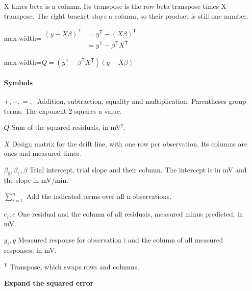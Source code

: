 \documentclass[11pt,a4paper]{article}
\begin{document}
X times beta is a column. Its transpose is the row beta transpose times X transpose. The right bracket stays a column, so their product is still one number.
\begin{center}\begin{adjustbox}{max width=\linewidth}$\displaystyle \begin{aligned}(y-X\beta)^{\mathsf T}&=y^{\mathsf T}-(X\beta)^{\mathsf T}\\&=y^{\mathsf T}-\beta^{\mathsf T}X^{\mathsf T}\end{aligned}$\end{adjustbox}\end{center}


\begin{center}\begin{adjustbox}{max width=\linewidth}$\displaystyle Q=(y^{\mathsf T}-\beta^{\mathsf T}X^{\mathsf T})(y-X\beta)$\end{adjustbox}\end{center}

\paragraph{Symbols}
\par\noindent\textbf{\(+,-,=,\cdot\)} Addition, subtraction, equality and multiplication. Parentheses group terms. The exponent 2 squares a value.
\par\noindent\textbf{\(Q\)} Sum of the squared residuals, in mV\ensuremath{{}^2}.
\par\noindent\textbf{\(X\)} Design matrix for the drift line, with one row per observation. Its columns are ones and measured times.
\par\noindent\textbf{\(\beta_0,\beta_1,\beta\)} Trial intercept, trial slope and their column. The intercept is in mV and the slope in mV/min.
\par\noindent\textbf{\(\sum_{i=1}^{n}\)} Add the indicated terms over all n observations.
\par\noindent\textbf{\(e_i,e\)} One residual and the column of all residuals, measured minus predicted, in mV.
\par\noindent\textbf{\(y_i,y\)} Measured response for observation i and the column of all measured responses, in mV.
\par\noindent\textbf{\({}^{\mathsf T}\)} Transpose, which swaps rows and columns.
\medskip

\textbf{Expand the squared error}
\end{document}
